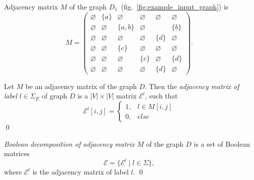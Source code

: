 Adjacency matrix $M$ of the graph $D_1$~(fig.~\ref{fig:example_input_graph}) is
{
    \renewcommand{\arraystretch}{0.7}
    \setlength\arraycolsep{2pt}
$$
    M =
    \begin{pmatrix}
    \varnothing     & \{a\} &   \varnothing      &   \varnothing   &   \varnothing   &   \varnothing   \\
    \varnothing     &   \varnothing   & \{a, b\} &   \varnothing   &       & \{b\} \\
    \varnothing     &   \varnothing   &   \varnothing      &   \varnothing   & \{d\} &   \varnothing   \\
    \varnothing     &   \varnothing   & \{c\}    &   \varnothing   &   \varnothing   &   \varnothing   \\
    \varnothing     &   \varnothing   &   \varnothing      & \{c\} &   \varnothing   & \{d\} \\
    \varnothing     & \varnothing     &   \varnothing      &   \varnothing   & \{d\} &   \varnothing
    \end{pmatrix}.
$$
}

\begin{definition}
Let $M$ be an adjacency matrix of the graph $D$. Then the \emph{adjacency matrix of label} $l \in \Sigma_E$ of graph $D$ is a $|V| \times |V|$ matrix $\mathcal{E}^l$, such that
\begin{equation*}
\mathcal{E}^l[i,j] =
 \begin{cases}
   1, & l \in M[i,j]\\
   0, & else
 \end{cases}
\end{equation*} \qed
\end{definition}

\begin{definition}
\emph{Boolean decomposition of adjacency matrix} $M$ of the graph $D$ is a set of Boolean matrices $$\mathcal{E} = \{\mathcal{E}^l \mid l \in \Sigma\},$$
where $\mathcal{E}^l$ is the adjacency matrix of label $l$. \qed
\end{definition}

